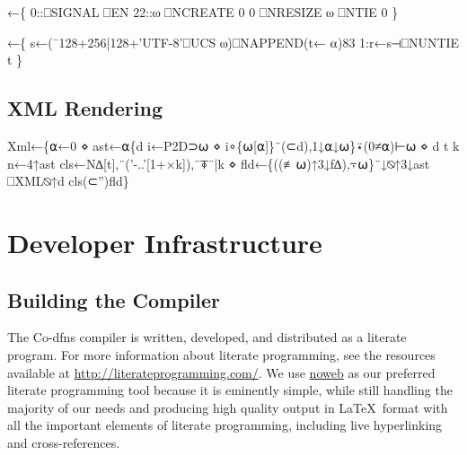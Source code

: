 \documentclass{article}%
\begin{document}
\nwenddocs{}\endmoddef\nwstartdeflinemarkup{}\nwenddeflinemarkup
{}←\{
        0::⎕SIGNAL ⎕EN
        22::⍵ ⎕NCREATE 0
        0 ⎕NRESIZE ⍵ ⎕NTIE 0
\}

←\{
        s←(¯128+256|128+'UTF-8'⎕UCS ⍵)⎕NAPPEND(t← ⍺)83
        1:r←s⊣⎕NUNTIE t
\}
\eatline
{}\nwendcode{}\nwdocspar
\subsection{XML Rendering}

\nwenddocs{}\endmoddef\nwstartdeflinemarkup{}\nwenddeflinemarkup
Xml←\{⍺←0 ⋄ ast←⍺\{d i←P2D⊃⍵ ⋄ i∘\{⍵[⍺]\}¨(⊂d),1↓⍺↓⍵\}⍣(0≠⍺)⊢⍵ ⋄ d t k n←4↑ast
        cls←N∆[t],¨('-..'[1+×k]),¨⍕¨|k ⋄ fld←\{((≢⍵)↑3↓f∆),⍪⍵\}¨↓⍉↑3↓ast
        ⎕XML⍉↑d cls(⊂'')fld\}
\nwendcode{}\nwdocspar

\section{Developer Infrastructure}

\subsection{Building the Compiler}

The Co-dfns compiler is written, developed, and distributed as a
literate program.
For more information about literate programming,
see the resources available at \url{http://literateprogramming.com/}.
We use \href{https://www.cs.tufts.edu/~nr/noweb/}{noweb} as our
preferred literate programming tool because it is eminently simple,
while still handling the majority of our needs and producing high
quality output in \LaTeX\ format with all the important elements of
literate programming, including live hyperlinking and cross-references.
\end{document}
